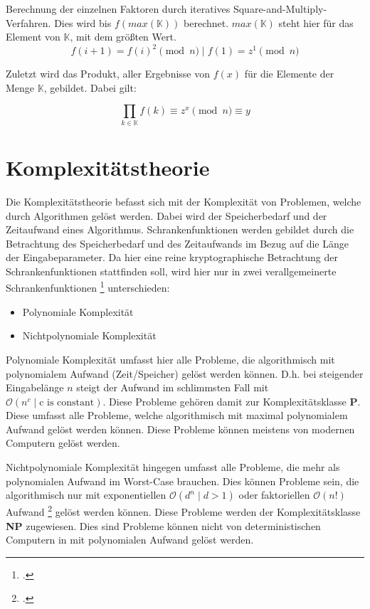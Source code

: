             Berechnung der einzelnen Faktoren durch iteratives Square-and-Multiply-Verfahren. Dies wird bis $f(max(\mathbb{K}))$ berechnet. $max(\mathbb{K})$ steht hier für das Element von $\mathbb{K}$, mit dem größten Wert.
            \begin{equation}
                f(i+1) = f(i)^{2} \pmod n \mid f(1) = z^{1} \pmod n 
            \end{equation}

            Zuletzt wird das Produkt, aller Ergebnisse von $f(x)$ für die Elemente der Menge $\mathbb{K}$, gebildet. Dabei gilt:

            \begin{equation}
                \prod_{k \in \mathbb{K}} f(k) \equiv z^{x} \pmod n \equiv y
            \end{equation}

    

\section{Komplexitätstheorie}
    Die Komplexitätstheorie befasst sich mit der Komplexität von Problemen, welche durch Algorithmen gelöst werden. Dabei wird der Speicherbedarf und der Zeitaufwand eines Algorithmus. Schrankenfunktionen werden gebildet durch die Betrachtung des Speicherbedarf und des Zeitaufwands im Bezug auf die Länge der Eingabeparameter. Da hier eine reine kryptographische Betrachtung der Schrankenfunktionen stattfinden soll, wird hier nur in zwei verallgemeinerte Schrankenfunktionen \footcite[178]{BSW.2015} unterschieden:
    \begin{itemize}
        \item Polynomiale Komplexität
        \item Nichtpolynomiale Komplexität
    \end{itemize}
    Polynomiale Komplexität umfasst hier alle Probleme, die algorithmisch mit polynomialem Aufwand (Zeit/Speicher) gelöst werden können. D.h. bei steigender Eingabelänge $n$ steigt der Aufwand im schlimmsten Fall mit $\mathcal{O}(n^{c} \mid \text{c is constant})$.
    Diese Probleme gehören damit zur Komplexitätsklasse \textbf{P}. Diese umfasst alle Probleme, welche algorithmisch mit maximal polynomialem Aufwand gelöst werden können. Diese Probleme können meistens von modernen Computern gelöst werden.

    Nichtpolynomiale Komplexität hingegen umfasst alle Probleme, die mehr als polynomialen Aufwand im Worst-Case brauchen. Dies können Probleme sein, die algorithmisch nur mit exponentiellen $\mathcal{O}(d^{n} \mid d > 1)$ oder faktoriellen $\mathcal{O}(n!)$ Aufwand \footcite{wiki.komplex} gelöst werden können. 
    Diese Probleme werden der Komplexitätsklasse \textbf{NP} zugewiesen. Dies sind Probleme können nicht von deterministischen Computern in mit polynomialen Aufwand gelöst werden. 
    
